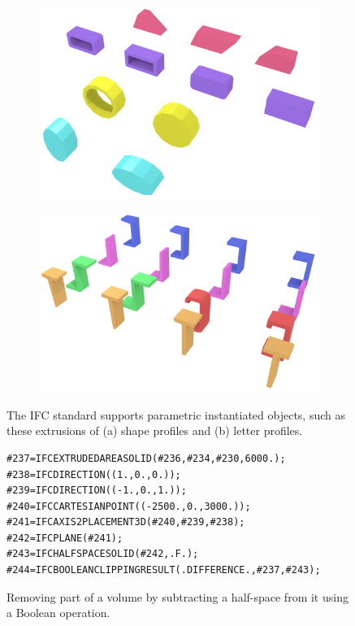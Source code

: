 \begin{figure}[htbp]
\centering
\begin{subfigure}[b]{0.45\linewidth}
\includegraphics[width=\linewidth]{figs/profiles}%
\label{subfig:profiles}
\end{subfigure}
\quad
\begin{subfigure}[b]{0.45\linewidth}
\includegraphics[width=\linewidth]{figs/letter_profiles}%
\label{subfig:letter-profiles}
\end{subfigure}
\caption{The IFC standard supports parametric instantiated objects, such as these extrusions of (a) shape profiles and (b) letter profiles.}%
\label{fig:profiles}
\end{figure}

\begin{figure}[htbp]
\begin{lstlisting}[frame=single]
#237=IFCEXTRUDEDAREASOLID(#236,#234,#230,6000.);
#238=IFCDIRECTION((1.,0.,0.));
#239=IFCDIRECTION((-1.,0.,1.));
#240=IFCCARTESIANPOINT((-2500.,0.,3000.));
#241=IFCAXIS2PLACEMENT3D(#240,#239,#238);
#242=IFCPLANE(#241);
#243=IFCHALFSPACESOLID(#242,.F.);
#244=IFCBOOLEANCLIPPINGRESULT(.DIFFERENCE.,#237,#243);
\end{lstlisting}
\caption{Removing part of a volume by subtracting a half-space from it using a Boolean operation.}%
\label{fig:csg}
\end{figure}

